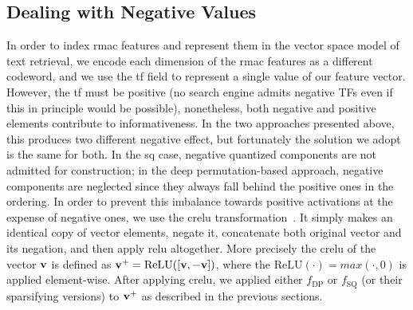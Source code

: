 

\subsection{Dealing with Negative Values}

In order to index \gls{rmac} features and represent them in the vector space model of text retrieval, we encode each dimension of the \gls{rmac} features as a different codeword, and we use the \gls{tf} field to represent a single value of our feature vector.
However, the \gls{tf} must be positive (no search engine admits negative TFs even if this in principle would be possible), nonetheless, both negative and positive elements contribute to informativeness.
In the two approaches presented above, this produces two different negative effect, but fortunately the solution we adopt is the same for both.
In the \gls{sq} case, negative quantized components are not admitted for construction; in the deep permutation-based approach, negative components are neglected since they always fall behind the positive ones in the ordering.
In order to prevent this imbalance towards positive activations at the expense of negative ones, we use the \gls{crelu} transformation~\cite{shang2016understanding}.
It simply makes an identical copy of vector elements, negate it, concatenate both original vector and its negation, and then apply \gls{relu} altogether.
More precisely the \gls{crelu} of the vector $\mathbf{v}$ is defined as $\mathbf{v}^+ = \text{ReLU}([\mathbf{v}, -\mathbf{v}])$, where the $\text{ReLU}(\cdot) = max(\cdot, 0)$ is applied element-wise.
After applying \gls{crelu}, we applied either $f_\text{DP}$ or $f_\text{SQ}$ (or their sparsifying versions) to $\mathbf{v}^+$ as described in the previous sections.

